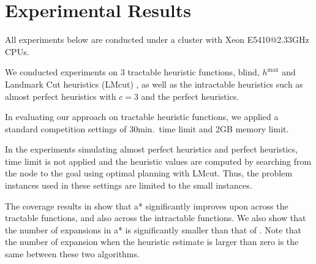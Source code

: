
\section{Experimental Results}
\label{sec-3}

All experiments below are conducted under a cluster with Xeon E5410@2.33GHz CPUs.

We conducted experiments on 3 tractable heuristic functions, blind, $h^{\mbox{max}}$ and Landmark Cut heuristics (LMcut) \cite{Helmert2009}, as well as the intractable heuristics such as almost perfect heuristics with $c=3$ and the perfect heuristics.

In evaluating our approach on tractable heuristic functions, we applied a standard competition settings of 30min.\ time limit and 2GB memory limit.

In the experiments simulating almost perfect heuristics and perfect
heuristics, time limit is not applied and the heuristic values are computed by searching
from the node to the goal using optimal planning with LMcut. Thus, the
problem instances used in these settings are limited to the small instances.


The coverage results in  show that \*a* significantly improves upon \astar across the tractable functions, and also across the intractable functions. We also show that the number of expansions in \*a* is significantly smaller than that of \astar. Note that the number of expansion when the heuristic estimate is larger than zero is the same between these two algorithms.

